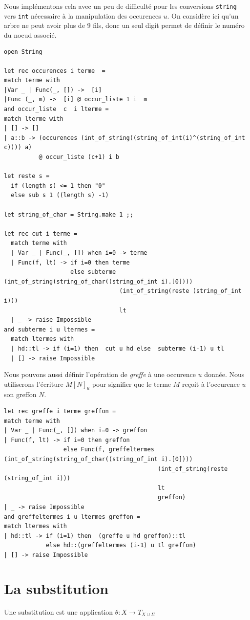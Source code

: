 Nous implémentons cela avec un peu de difficulté pour les conversions 
\texttt{string} vers \texttt{int} nécessaire à la manipulation des occurences $u$. 
On considère ici qu'un arbre ne peut avoir plus de 9 fils, donc un seul digit permet de définir le numéro du noeud associé.
\begin{verbatim}
open String

let rec occurences i terme  =
match terme with
|Var _ | Func(_, []) ->  [i]
|Func (_, m) ->  [i] @ occur_liste 1 i  m 
and occur_liste  c  i lterme =
match lterme with
| [] -> []
| a::b -> (occurences (int_of_string((string_of_int(i)^(string_of_int c)))) a) 
          @ occur_liste (c+1) i b

let reste s =
  if (length s) <= 1 then "0"
  else sub s 1 ((length s) -1)

let string_of_char = String.make 1 ;;

let rec cut i terme =
  match terme with
  | Var _ | Func(_, []) when i=0 -> terme
  | Func(f, lt) -> if i=0 then terme 
                   else subterme (int_of_string(string_of_char((string_of_int i).[0])))
                                 (int_of_string(reste (string_of_int i)))
                                 lt
  | _ -> raise Impossible
and subterme i u ltermes =
  match ltermes with
  | hd::tl -> if (i=1) then  cut u hd else  subterme (i-1) u tl
  | [] -> raise Impossible

\end{verbatim}
Nous pouvons aussi définir l'opération de \textit{greffe} à une occurence $u$ donnée. Nous utiliserons
l'écriture $M[N]_u$ pour signifier que le terme $M$ reçoit à l'occurence $u$ son greffon $N$.
\begin{verbatim}
let rec greffe i terme greffon =
match terme with
| Var _ | Func(_, []) when i=0 -> greffon
| Func(f, lt) -> if i=0 then greffon 
				 else Func(f, greffeltermes (int_of_string(string_of_char((string_of_int i).[0]))) 
				  			                (int_of_string(reste (string_of_int i)))  
								            lt
								            greffon)
| _ -> raise Impossible
and greffeltermes i u ltermes greffon =
match ltermes with
| hd::tl -> if (i=1) then  (greffe u hd greffon)::tl  
            else hd::(greffeltermes (i-1) u tl greffon)
| [] -> raise Impossible
\end{verbatim}

\section{La substitution}
Une substitution est une application $\theta : X \rightarrow T_{X \cup \Sigma} $


